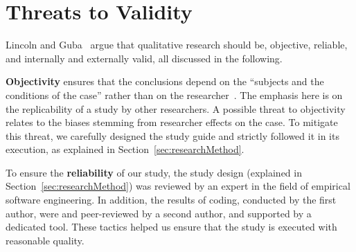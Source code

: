 \documentclass[sigconf]{acmart}
\begin{document}



\maketitle







\section{Threats to Validity}\label{sec:threatsToValidity}
Lincoln and Guba~\cite{Lincoln1985} argue that qualitative research should be, objective, reliable, and internally and externally valid, all discussed in the following.%

{\bf Objectivity} ensures that the conclusions depend on the ``subjects and the conditions of the case'' rather than on the researcher~\cite{Miles}. The emphasis here is on the replicability of a study by other researchers. A possible threat to objectivity relates to the biases stemming from researcher effects on the case. To mitigate this threat, we carefully designed the study guide and strictly followed it in its execution, as explained in Section~\ref{sec:researchMethod}. 

To ensure the {\bf reliability} of our study, the study design (explained in Section~\ref{sec:researchMethod}) was reviewed by an expert in the field of empirical software engineering. In addition, the results of coding, conducted by the first author, were and peer-reviewed by a second author, and supported by a dedicated tool. These tactics helped us ensure that the study is executed with reasonable quality.
\end{document}
